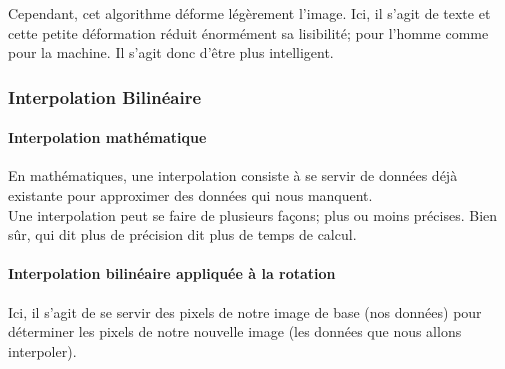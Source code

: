 Cependant, cet algorithme déforme légèrement l'image. Ici, il s'agit de texte et
cette petite déformation réduit énormément sa lisibilité; pour l'homme comme
pour la machine. Il s'agit donc d'être plus intelligent.

\subsubsection{Interpolation Bilinéaire}

\paragraph{Interpolation mathématique\\}

En mathématiques, une interpolation consiste à se servir de données déjà
existante pour approximer des données qui nous manquent. \\

Une interpolation peut se faire de plusieurs façons; plus ou moins précises.
Bien sûr, qui dit plus de précision dit plus de temps de calcul.

\paragraph{Interpolation bilinéaire appliquée à la rotation\\}

Ici, il s'agit de se servir des pixels de notre image de base (nos données) pour
déterminer les pixels de notre nouvelle image (les données que nous allons
interpoler). \\

